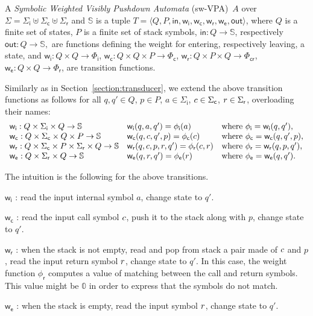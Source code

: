 \documentclass[runningheads]{llncs}
\def\<#1>{\langle #1 \rangle}
\newcommand{\Semiring}{\mathbb{S}}
\newcommand{\zero}{\mathbb{0}}
\def\SWVPA{\textsf{sw-VPA}\xspace}
\def\wei{\mathsf{w}}
\def\init{\mathsf{in}}
\def\final{\mathsf{out}}
\newcommand{\call}[1]{\ensuremath #1} %
\newcommand{\return}[1]{\ensuremath #1} %
\def\Sigmai{{\Sigma_\mathsf{i}}}
\def\Sigmac{{\Sigma_\mathsf{c}}}
\def\Sigmar{{\Sigma_\mathsf{r}}}
\def\Phii{{\Phi_\mathsf{i}}}
\def\Phic{{\Phi_\mathsf{c}}}
\def\Phir{{\Phi_\mathsf{r}}}
\def\Phicr{{\Phi_\mathsf{cr}}}
\def\weii{{\wei_\mathsf{i}}}
\def\weic{{\wei_\mathsf{c}}}
\def\weir{{\wei_\mathsf{r}}}
\def\weie{{\wei_\mathsf{e}}}
\begin{document}
\begin{definition}
A \emph{Symbolic Weighted Visibly Pushdown Automata} (\SWVPA)~$A$ 
over  $\Sigma = \Sigmai \uplus \Sigmac \uplus \Sigmar$ and $\Semiring$ is a tuple
$T = \< Q, P, \init, \weii, \weic, \weir, \weie, \final >$,
where $Q$ is a finite set of states, 
$P$ is a finite set of stack symbols, 
$\mathsf{in} : Q \to \Semiring$, 
respectively $\mathsf{out} : Q \to \Semiring,$
are functions defining the weight for entering, 
respectively leaving, a state, 
and 
$\weii : Q \times Q \to \Phii$,  
$\weic : Q \times Q \times P \to \Phic$,  
$\weir : Q \times P \times Q \to \Phicr$,  
$\weie : Q \times Q \to \Phir$,  
are transition functions.
\end{definition}
%
Similarly as in Section~\ref{section:transducer}, 
we extend the above transition functions as follows
for all $q, q' \in Q$, $p \in P$, 
$a \in \Sigmai$, 
$\call{c} \in \Sigmac$, 
$\return{r} \in \Sigmar$, 
overloading their names: %
\[
\begin{array}{lll}
\weii: Q \times \Sigmai \times Q \to \Semiring & 
\weii(q, a, q') = \phi_\mathsf{i}(a) & 
\mathrm{where~} \phi_\mathsf{i} = \weii(q, q'),\\
%
\weic: Q \times \Sigmac \times Q \times P \to \Semiring & 
\weic(q, \call{c}, q', p) = \phi_\mathsf{c}(\call{c}) & 
\mathrm{where~} \phi_\mathsf{c} = \weic(q, q', p),\\
%
\weir: Q \times \Sigmac \times P \times \Sigmar \times Q \to \Semiring & 
\weir(q, {\call{c}},  p, {\return{r}}, q') = \phi_\mathsf{r}({\call{c}},  {\return{r}}) & 
\mathrm{where~} \phi_\mathsf{r} = \weir(q, p, q'),\\
%
\weie: Q \times \Sigmar \times Q \to \Semiring & 
\weie(q, {\return{r}}, q') = \phi_\mathsf{e}({\return{r}}) &
\mathrm{where~} \phi_\mathsf{e} = \weie(q, q').\\
\end{array}      
\]

\noindent
The intuition is the following for the above transitions.
\begin{description}
\item $\weii$ : read the input internal symbol $a$, change state to $q'$.
\item $\weic$ : read the input call symbol $\call{c}$, push it to the stack along with $p$, change state to $q'$.
\item $\weir$ : when the stack is not empty, 
      read and pop from stack a pair made of $\call{c}$ and $p$, 
      read the input return symbol $\return{r}$, change state to $q'$.
      In this case, the weight function $\phi_\mathsf{r}$ 
      computes a value of matching between the call and return symbols.
      This value might be $\zero$ in order to express that the symbols do not match.
\item $\weie$ : when the stack is empty, 
      read the input symbol $\call{r}$, change state to $q'$.
\end{description}
\end{document}
